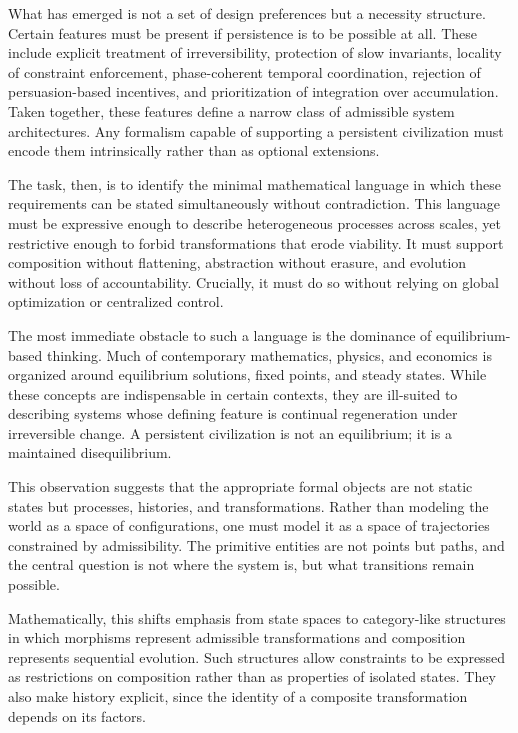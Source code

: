 \documentclass[12pt,oneside]{book}
\begin{document}
What has emerged is not a set of design preferences but a necessity structure. Certain features must be present if persistence is to be possible at all. These include explicit treatment of irreversibility, protection of slow invariants, locality of constraint enforcement, phase-coherent temporal coordination, rejection of persuasion-based incentives, and prioritization of integration over accumulation. Taken together, these features define a narrow class of admissible system architectures. Any formalism capable of supporting a persistent civilization must encode them intrinsically rather than as optional extensions.

The task, then, is to identify the minimal mathematical language in which these requirements can be stated simultaneously without contradiction. This language must be expressive enough to describe heterogeneous processes across scales, yet restrictive enough to forbid transformations that erode viability. It must support composition without flattening, abstraction without erasure, and evolution without loss of accountability. Crucially, it must do so without relying on global optimization or centralized control.

The most immediate obstacle to such a language is the dominance of equilibrium-based thinking. Much of contemporary mathematics, physics, and economics is organized around equilibrium solutions, fixed points, and steady states. While these concepts are indispensable in certain contexts, they are ill-suited to describing systems whose defining feature is continual regeneration under irreversible change. A persistent civilization is not an equilibrium; it is a maintained disequilibrium.

This observation suggests that the appropriate formal objects are not static states but processes, histories, and transformations. Rather than modeling the world as a space of configurations, one must model it as a space of trajectories constrained by admissibility. The primitive entities are not points but paths, and the central question is not where the system is, but what transitions remain possible.

Mathematically, this shifts emphasis from state spaces to category-like structures in which morphisms represent admissible transformations and composition represents sequential evolution. Such structures allow constraints to be expressed as restrictions on composition rather than as properties of isolated states. They also make history explicit, since the identity of a composite transformation depends on its factors.
\end{document}
